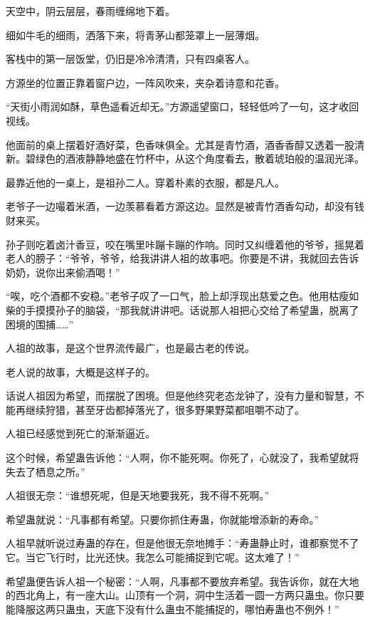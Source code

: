 
\begin{this_body}

天空中，阴云层层，春雨缠绵地下着。

细如牛毛的细雨，洒落下来，将青茅山都笼罩上一层薄烟。

客栈中的第一层饭堂，仍旧是冷冷清清，只有四桌客人。

方源坐的位置正靠着窗户边，一阵风吹来，夹杂着诗意和花香。

“天街小雨润如酥，草色遥看近却无。”方源遥望窗口，轻轻低吟了一句，这才收回视线。

他面前的桌上摆着好酒好菜，色香味俱全。尤其是青竹酒，酒香香醇又透着一股清新。碧绿色的酒液静静地盛在竹杯中，从这个角度看去，散着琥珀般的温润光泽。

最靠近他的一桌上，是祖孙二人。穿着朴素的衣服，都是凡人。

老爷子一边嘬着米酒，一边羡慕看着方源这边。显然是被青竹酒香勾动，却没有钱财来买。

孙子则吃着卤汁香豆，咬在嘴里咔蹦卡蹦的作响。同时又纠缠着他的爷爷，摇晃着老人的膀子：“爷爷，爷爷，给我讲讲人祖的故事吧。你要是不讲，我就回去告诉奶奶，说你出来偷酒喝！”

“唉，吃个酒都不安稳。”老爷子叹了一口气，脸上却浮现出慈爱之色。他用枯瘦如柴的手摸摸孙子的脑袋，“那我就讲讲吧。话说那人祖把心交给了希望蛊，脱离了困境的围捕……”

人祖的故事，是这个世界流传最广，也是最古老的传说。

老人说的故事，大概是这样子的。

话说人祖因为希望，而摆脱了困境。但是他终究老态龙钟了，没有力量和智慧，不能再继续狩猎，甚至牙齿都掉落光了，很多野果野菜都咀嚼不动了。

人祖已经感觉到死亡的渐渐逼近。

这个时候，希望蛊告诉他：“人啊，你不能死啊。你死了，心就没了，我希望就将失去了栖息之所。”

人祖很无奈：“谁想死呢，但是天地要我死，我不得不死啊。”

希望蛊就说：“凡事都有希望。只要你抓住寿蛊，你就能增添新的寿命。”

人祖早就听说过寿蛊的存在，但是他很无奈地摊手：“寿蛊静止时，谁都察觉不了它。当它飞行时，比光还快。我怎么可能捕捉到它呢。这太难了！”

希望蛊便告诉人祖一个秘密：“人啊，凡事都不要放弃希望。我告诉你，就在大地的西北角上，有一座大山。山顶有一个洞，洞中生活着一圆一方两只蛊虫。你只要能降服这两只蛊虫，天底下没有什么蛊虫不能捕捉的，哪怕寿蛊也不例外！”


\end{this_body}
